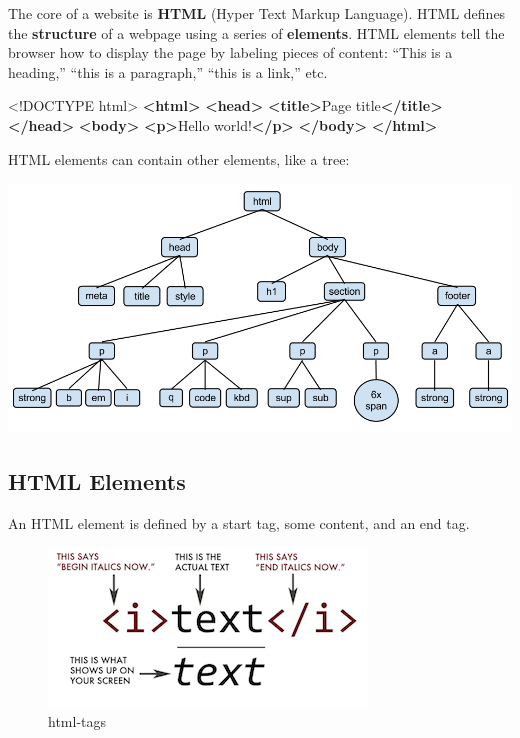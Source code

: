 \documentclass[]{book}
\newenvironment{Shaded}{\begin{snugshade}}{\end{snugshade}}
\newcommand{\KeywordTok}[1]{\textcolor[rgb]{0.13,0.29,0.53}{\textbf{#1}}}
\newcommand{\DataTypeTok}[1]{\textcolor[rgb]{0.13,0.29,0.53}{#1}}
\newcommand{\NormalTok}[1]{#1}
\begin{document}
The core of a website is \textbf{HTML} (Hyper Text Markup Language).
HTML defines the \textbf{structure} of a webpage using a series of
\textbf{elements}. HTML elements tell the browser how to display the
page by labeling pieces of content: ``This is a heading,'' ``this is a
paragraph,'' ``this is a link,'' etc.

\begin{Shaded}
\begin{Highlighting}[]
\DataTypeTok{<!DOCTYPE }\NormalTok{html}\DataTypeTok{>}
\KeywordTok{<html>}
    \KeywordTok{<head>}
        \KeywordTok{<title>}\NormalTok{Page title}\KeywordTok{</title>}
    \KeywordTok{</head>}
    \KeywordTok{<body>}
        \KeywordTok{<p>}\NormalTok{Hello world!}\KeywordTok{</p>}
    \KeywordTok{</body>}
\KeywordTok{</html>}
\end{Highlighting}
\end{Shaded}

HTML elements can contain other elements, like a tree:

\begin{center}\includegraphics[width=0.7\linewidth]{img/HTMLDOMTree} \end{center}

\subsection{HTML Elements}\label{html-elements}

An HTML element is defined by a start tag, some content, and an end tag.

\begin{figure}
\centering
\includegraphics{img/html-tags.png}
\caption{html-tags}
\end{figure}
\end{document}
